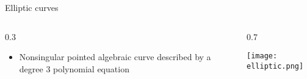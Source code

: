 \documentclass{beamer}
\theoremstyle{definition}
\begin{document}
                                                                                                           \begin{frame}{Elliptic curves}

                                                                                                                   \begin{columns}[c]
        \begin{column}{0.3\hsize}

          \begin{itemize}
            \item
          Nonsingular pointed algebraic curve described by a degree $3$
          polynomial equation
          \end{itemize}
        \end{column}
        \begin{column}{0.7\hsize}

            \texttt{[image: elliptic.png]}

        \end{column}
      \end{columns}
                                                                                                           \end{frame}
\end{document}
